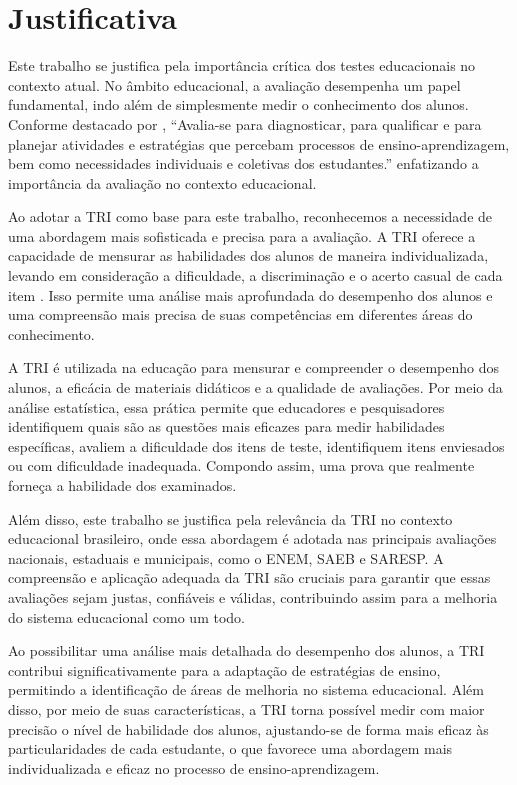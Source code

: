 \section{Justificativa}

Este trabalho se justifica pela importância crítica dos testes educacionais no contexto atual. 	No âmbito educacional, a avaliação desempenha um papel fundamental, indo além de simplesmente medir o conhecimento dos alunos. Conforme destacado por \cite{silva2019}, ``Avalia-se para diagnosticar, para qualificar e para planejar atividades e estratégias que percebam processos de ensino-aprendizagem, bem como necessidades individuais e coletivas dos estudantes.'' enfatizando a importância da avaliação no contexto educacional.

Ao adotar a TRI como base para este trabalho, reconhecemos a necessidade de uma abordagem mais sofisticada e precisa para a avaliação. A TRI oferece a capacidade de mensurar as habilidades dos alunos de maneira individualizada, levando em consideração a dificuldade, a discriminação e o acerto casual de cada item \cite{pasquali2018}. Isso permite uma análise mais aprofundada do desempenho dos alunos e uma compreensão mais precisa de suas competências em diferentes áreas do conhecimento.

A TRI é utilizada na educação para mensurar e compreender o desempenho dos alunos, a eficácia de materiais didáticos e a qualidade de avaliações. Por meio da análise estatística, essa prática permite que educadores e pesquisadores identifiquem quais são as questões mais eficazes para medir habilidades específicas, avaliem a dificuldade dos itens de teste, identifiquem itens enviesados ou com dificuldade inadequada. Compondo assim, uma prova que realmente forneça a habilidade dos examinados.

Além disso, este trabalho se justifica pela relevância da TRI no contexto educacional brasileiro, onde essa abordagem é adotada nas principais avaliações nacionais, estaduais e municipais, como o ENEM, SAEB e SARESP. A compreensão e aplicação adequada da TRI são cruciais para garantir que essas avaliações sejam justas, confiáveis e válidas, contribuindo assim para a melhoria do sistema educacional como um todo.

Ao possibilitar uma análise mais detalhada do desempenho dos alunos, a TRI contribui significativamente para a adaptação de estratégias de ensino, permitindo a identificação de áreas de melhoria no sistema educacional. Além disso, por meio de suas características, a TRI torna possível medir com maior precisão o nível de habilidade dos alunos, ajustando-se de forma mais eficaz às particularidades de cada estudante, o que favorece uma abordagem mais individualizada e eficaz no processo de ensino-aprendizagem.



